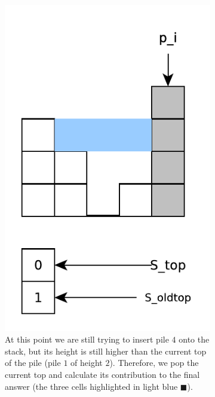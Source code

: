 \begin{figure}
\begin{subfigure}[t]{0.24\textwidth}
		\includegraphics[width=1\linewidth]{sources/trapping_water/images/stack_ex6}
		\caption{At this point we are still trying to insert pile $4$ onto the stack, but its height is still higher than the current top of the pile (pile $1$ of height $2$). Therefore, we pop the current top and calculate its contribution to the final answer (the three cells highlighted in light blue \textcolor[HTML]{99ccff}{$\blacksquare$}).}
		\label{fig:trapping_water:stack_ex3}
	 \end{subfigure}
	 \hfill
	 \begin{subfigure}[t]{0.24\textwidth}

\end{subfigure}
\end{figure}

